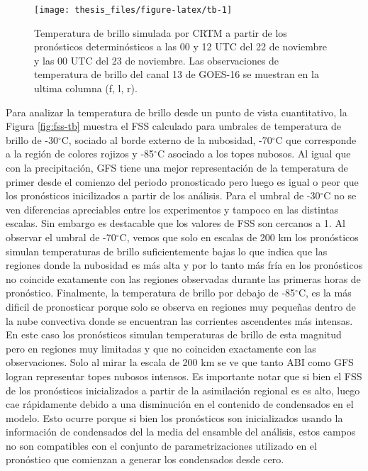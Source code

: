 \documentclass[12pt,oneside,a4paper]{reedthesis}
\begin{document}
\begin{figure}

{\centering \texttt{[image: thesis\_files/figure-latex/tb-1]} 

}

\caption{Temperatura de brillo simulada por CRTM a partir de los pronósticos determinósticos a las 00 y 12 UTC del 22 de noviembre y las 00 UTC del 23 de noviembre. Las observaciones de temperatura de brillo del canal 13 de GOES-16 se muestran en la ultima columna (f, l, r).}\label{fig:tb}
\end{figure}
Para analizar la temperatura de brillo desde un punto de vista cuantitativo, la Figura \ref{fig:fss-tb} muestra el FSS calculado para umbrales de temperatura de brillo de -30\(^\circ\)C, sociado al borde externo de la nubosidad, -70\(^\circ\)C que corresponde a la región de colores rojizos y -85\(^\circ\)C asociado a los topes nubosos. Al igual que con la precipitación, GFS tiene una mejor representación de la temperatura de primer desde el comienzo del periodo pronosticado pero luego es igual o peor que los pronósticos inicilizados a partir de los análisis. Para el umbral de -30\(^\circ\)C no se ven diferencias apreciables entre los experimentos y tampoco en las distintas escalas. Sin embargo es destacable que los valores de FSS son cercanos a 1. Al observar el umbral de -70\(^\circ\)C, vemos que solo en escalas de 200 km los pronósticos simulan temperaturas de brillo suficientemente bajas lo que indica que las regiones donde la nubosidad es más alta y por lo tanto más fría en los pronósticos no coincide exatamente con las regiones observadas durante las primeras horas de pronóstico. Finalmente, la temperatura de brillo por debajo de -85\(^\circ\)C, es la más dificil de pronosticar porque solo se observa en regiones muy pequeñas dentro de la nube convectiva donde se encuentran las corrientes ascendentes más intensas. En este caso los pronósticos simulan temperaturas de brillo de esta magnitud pero en regiones muy limitadas y que no coinciden exactamente con las observaciones. Solo al mirar la escala de 200 km se ve que tanto ABI como GFS logran representar topes nubosos intensos. Es importante notar que si bien el FSS de los pronósticos inicializados a partir de la asimilación regional es es alto, luego cae rápidamente debido a una disminución en el contenido de condensados en el modelo. Esto ocurre porque si bien los pronósticos son inicializados usando la información de condensados del la media del ensamble del análisis, estos campos no son compatibles con el conjunto de parametrizaciones utilizado en el pronóstico que comienzan a generar los condensados desde cero.
\end{document}

